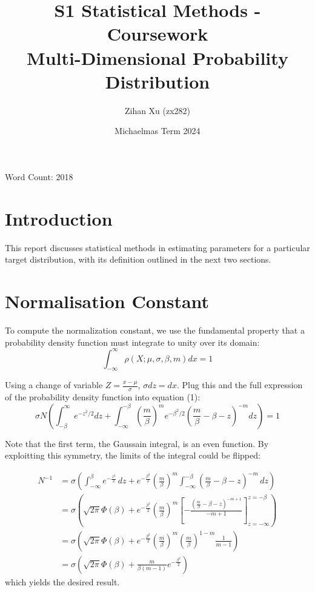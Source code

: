 \documentclass[a4paper, 12pt]{article}
\title{S1 Statistical Methods - Coursework \\ Multi-Dimensional Probability Distribution}
\author{Zihan Xu (zx282)}
\date{Michaelmas Term 2024}
\begin{document}
\maketitle
\begin{center}
    Word Count: 2018
\end{center}

\section{Introduction}
\hspace{1.5em}This report discusses statistical methods in estimating parameters for a particular target distribution, with its definition outlined in the next two sections. 
\section{Normalisation Constant}
\hspace{1.5em}To compute the normalization constant, we use the fundamental property that a probability density function must integrate to unity over its domain:
\begin{equation}
    \int_{-\infty}^{\infty} \rho (X;\mu,\sigma,\beta, m) dx = 1
\end{equation}
\par Using a change of variable $Z = \frac{x-\mu}{\sigma}$, $\sigma dz = dx$. Plug this and the full expression of the probability density function into equation (1):
\\
\begin{equation*}
    \sigma N (\int_{-\beta}^{\infty} e^{-z^{2}/2}dz + \int_{-\infty}^{-\beta}(\frac{m}{\beta})^{m}e^{-\beta^{2}/2} (\frac{m}{\beta} - \beta - z)^{-m} dz) = 1
\end{equation*}
\par Note that the first term, the Gaussain integral, is an even function. By exploitting this symmetry, the limits of the integral could be flipped: 

\begin{align*}
    N^{-1} &= \sigma \left( \int_{-\infty}^{\beta} e^{-\frac{z^2}{2}} \, dz 
    + e^{-\frac{\beta^2}{2}} \left( \frac{m}{\beta} \right)^m 
    \int_{-\infty}^{-\beta} \left( \frac{m}{\beta} - \beta - z \right)^{-m} \, dz \right) \\
    &= \sigma \left( \sqrt{2\pi} \Phi(\beta) + e^{-\frac{\beta^2}{2}} 
    \left( \frac{m}{\beta} \right)^m 
    \left[ -\frac{\left( \frac{m}{\beta} - \beta - z \right)^{-m+1}}{-m + 1} \right]_{z=-\infty}^{z=-\beta} \right) \\
    &= \sigma \left( \sqrt{2\pi} \Phi(\beta) + e^{-\frac{\beta^2}{2}} 
    \left( \frac{m}{\beta} \right)^m \left( \frac{m}{\beta} \right)^{1-m} \frac{1}{m-1} \right) \\
    &= \sigma \left( \sqrt{2\pi} \Phi(\beta) + \frac{m}{\beta (m-1)} e^{-\frac{\beta^2}{2}} \right)
\end{align*}
which yields the desired result. 
\end{document}
